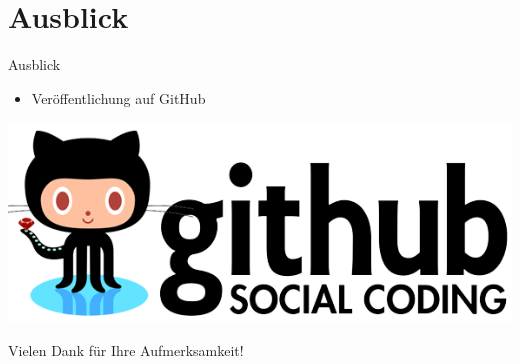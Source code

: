 \documentclass[18pt]{beamer}
\begin{document}
\section{Ausblick}
\begin{frame}{Ausblick}
\begin{itemize}
	\item Veröffentlichung auf GitHub
\end{itemize}
\begin{center}
	\includegraphics[scale=0.3]{img/github-logo.png}
\end{center}

\end{frame}

\appendix

\begin{frame}{}

\begin{LARGE}
\begin{center}
	Vielen Dank für Ihre Aufmerksamkeit!
\end{center}
\end{LARGE}
\end{frame}
\end{document}
